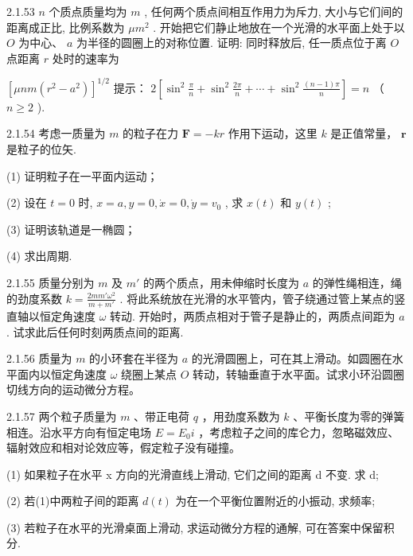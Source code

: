 \begin{problem}{2.1.53}
$n$ 个质点质量均为 $m$ , 任何两个质点间相互作用力为斥力, 大小与它们间的距离成正比, 比例系数为 $\mu m^2$ . 开始把它们静止地放在一个光滑的水平面上处于以 $O$ 为中心、 $a$ 为半径的圆圈上的对称位置. 证明: 同时释放后, 任一质点位于离 $O$ 点距离 $r$ 处时的速率为

$\left[\mu nm(r^2 - a^2)\right]^{1/2}$ 提示： $2\left[\sin^2 \frac{\pi}{n} + \sin^2 \frac{2\pi}{n} + \cdots + \sin^2 \frac{(n-1)\pi}{n}\right] = n$ （ $n \geqslant 2$ ).
\end{problem}
\clearpage


\begin{problem}{2.1.54}
考虑一质量为 $m$ 的粒子在力 $\bm{F} = -kr$ 作用下运动，这里 $k$ 是正值常量， $\bm{r}$ 是粒子的位矢.

(1) 证明粒子在一平面内运动；

(2) 设在 $t = 0$ 时, $x = a, y = 0, \dot{x} = 0, \dot{y} = v_0$ , 求 $x(t)$ 和 $y(t)$ ;

(3) 证明该轨道是一椭圆；

(4) 求出周期.
\end{problem}
\clearpage


\begin{problem}{2.1.55}
质量分别为 $m$ 及 $m'$ 的两个质点，用未伸缩时长度为 $a$ 的弹性绳相连，绳的劲度系数 $k = \frac{2mm' \omega^2}{m + m'}$ . 将此系统放在光滑的水平管内，管子绕通过管上某点的竖直轴以恒定角速度 $\omega$ 转动. 开始时，两质点相对于管子是静止的，两质点间距为 $a$ . 试求此后任何时刻两质点间的距离.
\end{problem}
\clearpage


\begin{problem}{2.1.56}
质量为 $m$ 的小环套在半径为 $a$ 的光滑圆圈上，可在其上滑动。如圆圈在水平面内以恒定角速度 $\omega$ 绕圈上某点 $O$ 转动，转轴垂直于水平面。试求小环沿圆圈切线方向的运动微分方程。
\end{problem}
\clearpage


\begin{problem}{2.1.57}
两个粒子质量为 $m$ 、带正电荷 $q$ ，用劲度系数为 $k$ 、平衡长度为零的弹簧相连。沿水平方向有恒定电场 $E = E_0 i$ ，考虑粒子之间的库仑力，忽略磁效应、辐射效应和相对论效应等，假定粒子没有碰撞。

(1) 如果粒子在水平 x 方向的光滑直线上滑动, 它们之间的距离 d 不变. 求 d;

(2) 若(1)中两粒子间的距离 $d(t)$ 为在一个平衡位置附近的小振动, 求频率;

(3) 若粒子在水平的光滑桌面上滑动, 求运动微分方程的通解, 可在答案中保留积分.
\end{problem}
\clearpage


